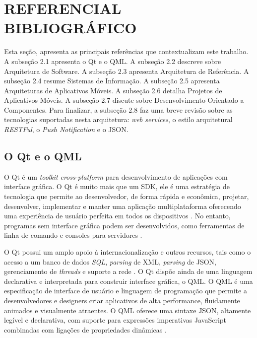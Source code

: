 \section{REFERENCIAL BIBLIOGRÁFICO}
Esta seção, apresenta as principais referências que contextualizam este trabalho. A subseção 2.1 apresenta o Qt e o QML. A subseção 2.2 descreve sobre Arquitetura de Software. A subseção 2.3 apresenta Arquitetura de Referência. A subseção 2.4 resume Sistemas de Informação. A subseção 2.5 apresenta Arquiteturas de Aplicativos Móveis. A subseção 2.6 detalha Projetos de Aplicativos Móveis. A subseção 2.7 discute sobre Desenvolvimento Orientado a Componentes. Para finalizar, a subseção 2.8 faz uma breve revisão sobre as tecnologias suportadas nesta arquitetura: \textit{web services}, o estilo arquitetural \textit{RESTFul}, o \textit{Push Notification} e o JSON.


\subsection{O Qt e o QML}
O Qt é um \textit{toolkit} \textit{cross-platform} para desenvolvimento de aplicações com interface gráfica. O Qt é muito mais que um SDK, ele é uma estratégia de tecnologia que permite ao desenvolvedor, de forma rápida e econômica, projetar, desenvolver, implementar e manter uma aplicação multiplataforma oferecendo uma experiência de usuário perfeita em todos os dispositivos \cite{qt_io}. No entanto, programas sem interface gráfica podem ser desenvolvidos, como ferramentas de linha de comando e consoles para servidores \cite{qt_software}.\par

O Qt possui um amplo apoio à internacionalização e outros recursos, tais como o acesso a um banco de dados \textit{SQL}, \textit{parsing} de XML, \textit{parsing} de JSON, gerenciamento de \textit{threads} e suporte a rede \cite{qt_gui_toolkit}. O Qt dispõe ainda de uma linguagem declarativa e interpretada para construir interface gráfica, o QML. O QML é uma especificação de interface de usuário e linguagem de programação que permite a desenvolvedores e designers criar aplicativos de alta performance, fluidamente animados e visualmente atraentes. O QML oferece uma sintaxe JSON, altamente legível e declarativa, com suporte para expressões imperativas JavaScript combinadas com ligações de propriedades dinâmicas \cite{doc_qt_io}.


